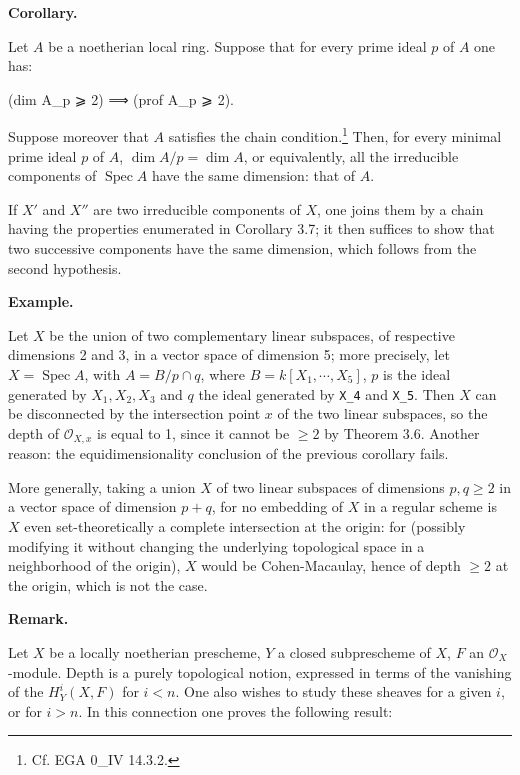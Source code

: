 \documentclass[
]{article}
\newenvironment{Shaded}{}{}
\newcommand{\NormalTok}[1]{#1}
\begin{document}
\textbf{Corollary.}

Let \(A\) be a noetherian local ring. Suppose that for every prime ideal
\(p\) of \(A\) one has:

\begin{Shaded}
\begin{Highlighting}[]
\NormalTok{(dim A\_p ⩾ 2) ⟹ (prof A\_p ⩾ 2).}
\end{Highlighting}
\end{Shaded}

Suppose moreover that \(A\) satisfies the chain condition.\footnote{Cf.
  EGA 0\_IV 14.3.2.} Then, for every minimal prime ideal \(p\) of \(A\),
\(\dim A/p = \dim A\), or equivalently, all the irreducible components
of \(\operatorname{Spec} A\) have the same dimension: that of \(A\).

If \(X'\) and \(X''\) are two irreducible components of \(X\), one joins
them by a chain having the properties enumerated in Corollary 3.7; it
then suffices to show that two successive components have the same
dimension, which follows from the second hypothesis.

\textbf{Example.}

Let \(X\) be the union of two complementary linear subspaces, of
respective dimensions 2 and 3, in a vector space of dimension 5; more
precisely, let \(X = \operatorname{Spec} A\), with \(A = B/p \cap q\),
where \(B = k[X_{1}, \cdots, X_{5}]\), \(p\) is the ideal generated by
\(X_{1}, X_{2}, X_{3}\) and \(q\) the ideal generated by \texttt{X\_4}
and \texttt{X\_5}. Then \(X\) can be disconnected by the intersection
point \(x\) of the two linear subspaces, so the depth of
\(\mathcal{O}_{X,x}\) is equal to 1, since it cannot be \(\geqslant 2\)
by Theorem 3.6. Another reason: the equidimensionality conclusion of the
previous corollary fails.

More generally, taking a union \(X\) of two linear subspaces of
dimensions \(p, q \geqslant 2\) in a vector space of dimension
\(p + q\), for no embedding of \(X\) in a regular scheme is \(X\) even
set-theoretically a complete intersection at the origin: for (possibly
modifying it without changing the underlying topological space in a
neighborhood of the origin), \(X\) would be Cohen-Macaulay, hence of
depth \(\geqslant 2\) at the origin, which is not the case.

\textbf{Remark.}

Let \(X\) be a locally noetherian prescheme, \(Y\) a closed subprescheme
of \(X\), \(F\) an \(\mathcal{O}_{X}\)-module. Depth is a purely
topological notion, expressed in terms of the vanishing of the
\(H^{i}_{Y}(X, F)\) for \(i < n\). One also wishes to study these
sheaves for a given \(i\), or for \(i > n\). In this connection one
proves the following result:
\end{document}
